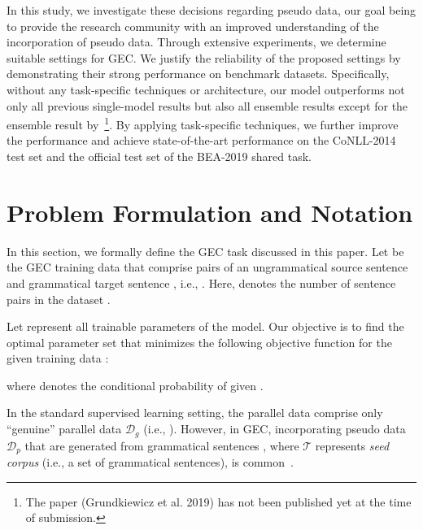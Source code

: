 \documentclass[11pt,a4paper]{article}
\newcommand{\pseudodata}{\ensuremath{\mathcal{D}_{p}}}
\newcommand{\genuinedata}{\ensuremath{\mathcal{D}_{g}}}
\newcommand{\seedcorpus}{\ensuremath{\mathcal{T}}}
\begin{document}
In this study, we investigate these decisions regarding pseudo data, our goal being to provide the research community with an improved understanding of the incorporation of pseudo data.
Through extensive experiments, we determine suitable settings for GEC. We justify the reliability of the proposed settings by demonstrating their strong performance on benchmark datasets.
Specifically, without any task-specific techniques or architecture, our model outperforms not only all previous single-model results but also all ensemble results except for the ensemble result by~\citet{grundkiewicz:2019:bea}\footnote{The paper (Grundkiewicz et al. 2019) has not been published yet at the time of submission.}.
By applying task-specific techniques, we further improve the performance and achieve state-of-the-art performance on the CoNLL-2014 test set and the official test set of the BEA-2019 shared task.


\section{Problem Formulation and Notation}
\label{sec:problem-formulation}

In this section, we formally define the GEC task discussed in this paper.
Let  be the GEC training data that comprise pairs of an ungrammatical source sentence  and grammatical target sentence , i.e., . 
Here,  denotes the number of sentence pairs in the dataset .


Let  represent all trainable parameters of the model.
Our objective is to find the optimal parameter set  that minimizes the following objective function  for the given training data :

where  denotes the conditional probability of  given .

In the standard supervised learning setting, the parallel data  comprise only ``genuine'' parallel data \genuinedata{} (i.e., ).
However, in GEC, incorporating pseudo data \pseudodata{} that are generated from grammatical sentences , where \seedcorpus{} represents \textit{seed corpus} (i.e., a set of grammatical sentences), is common~\citep{xie:2018:NAACL,zhao2019improving,grundkiewicz:2019:bea}.
\end{document}
